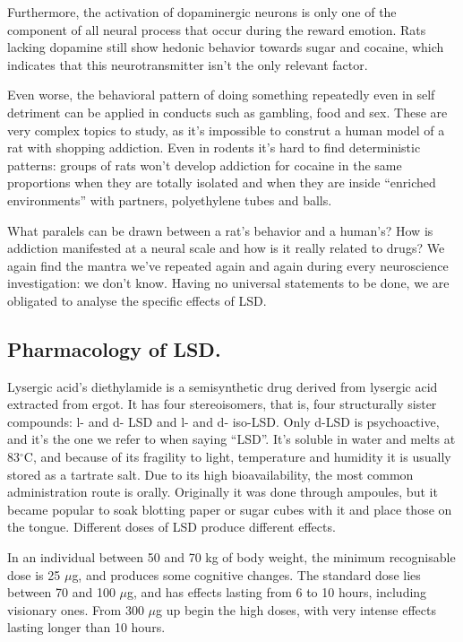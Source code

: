 Furthermore, the activation of dopaminergic neurons is only one of the component of all neural process that occur during the reward emotion. Rats lacking dopamine still show hedonic behavior towards sugar and cocaine, which indicates that this neurotransmitter isn't the only relevant factor.

Even worse, the behavioral pattern of doing something repeatedly even in self detriment can be applied in conducts such as gambling, food and sex. These are very complex topics to study, as it's impossible to construt a human model of a rat with shopping addiction. Even in rodents it's hard to find deterministic patterns: groups of rats won't develop addiction for cocaine in the same proportions when they are totally isolated and when they are inside \enquote{enriched environments} with partners, polyethylene tubes and balls.

What paralels can be drawn between a rat's behavior and a human's? How is addiction manifested at a neural scale and how is it really related to drugs? We again find the mantra we've repeated again and again during every neuroscience investigation: we don't know. Having no universal statements to be done, we are obligated to analyse the specific effects of LSD.

\newpage

\subsection{Pharmacology of LSD.}

Lysergic acid's diethylamide is a semisynthetic drug derived from lysergic acid extracted from ergot. It has four stereoisomers, that is, four structurally sister compounds: l- and d- LSD and l- and d- iso-LSD. Only d-LSD is psychoactive, and it's the one we refer to when saying \enquote{LSD}. It's soluble in water and melts at 83$^\circ$C, and because of its fragility to light, temperature and humidity it is usually stored as a tartrate salt. Due to its high bioavailability, the most common administration route is orally. Originally it was done through ampoules, but it became popular to soak blotting paper or sugar cubes with it and place those on the tongue. Different doses of LSD produce different effects.

In an individual between 50 and 70 kg of body weight, the minimum recognisable dose is 25 $\mu$g, and produces some cognitive changes. The standard dose lies between 70 and 100 $\mu$g, and has effects lasting from 6 to 10 hours, including visionary ones. From 300 $\mu$g up begin the high doses, with very intense effects lasting longer than 10 hours.

